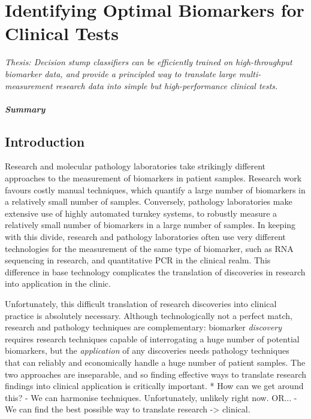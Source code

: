 \documentclass[dissertation.tex]{subfiles}
\begin{document}
\chapter[Identifying Optimal Biomarkers for Clinical Tests][Finding Optimal Biomarkers]{Identifying Optimal Biomarkers for Clinical Tests}
\label{chap:messina}


\emph{Thesis: Decision stump classifiers can be efficiently trained on high-throughput biomarker data, and provide a principled way to translate large multi-measurement research data into simple but high-performance clinical tests.}


\paragraph{Summary}


\section{Introduction}

Research and molecular pathology laboratories take strikingly different approaches to the measurement of biomarkers in patient samples.  Research work favours costly manual techniques, which quantify a large number of biomarkers in a relatively small number of samples.  Conversely, pathology laboratories make extensive use of highly automated turnkey systems, to robustly measure a relatively small number of biomarkers in a large number of samples.  In keeping with this divide, research and pathology laboratories often use very different technologies for the measurement of the same type of biomarker, such as RNA sequencing in research, and quantitative PCR in the clinical realm.  This difference in base technology complicates the translation of discoveries in research into application in the clinic.

Unfortunately, this difficult translation of research discoveries into clinical practice is absolutely necessary.  Although technologically not a perfect match, research and pathology techniques are complementary: biomarker \emph{discovery} requires research techniques capable of interrogating a huge number of potential biomarkers, but the \emph{application} of any discoveries needs pathology techniques that can reliably and economically handle a huge number of patient samples.  The two approaches are inseparable, and so finding effective ways to translate research findings into clinical application is critically important.  
* How can we get around this?
  - We can harmonise techniques.  Unfortunately, unlikely right now.
    OR...
  - We can find the best possible way to translate research -> clinical.
\end{document}
